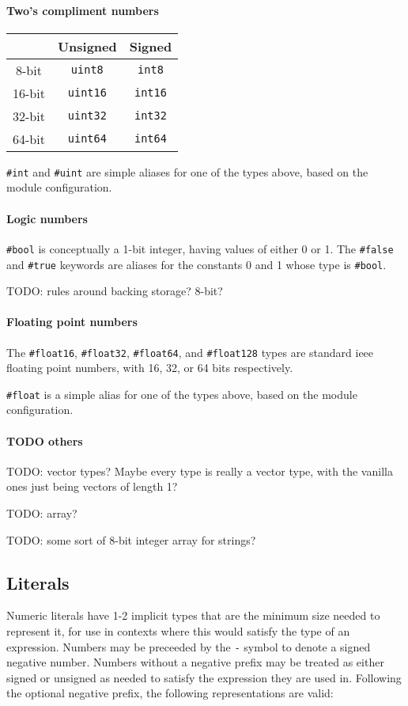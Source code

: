 \documentclass{article}
\newcommand{\code}[1]{\colorbox{light-gray}{\texttt{#1}}}
\newcommand{\breakingparagraph}[1]{\paragraph{#1}\mbox{}\medbreak}
\begin{document}
\breakingparagraph{Two's compliment numbers}

\begin{tabular}{ |c|c|c| }
  \hline
  & Unsigned & Signed\\\hline
  8-bit & \texttt{uint8} & \texttt{int8}\\\hline
  16-bit & \texttt{uint16} & \texttt{int16}\\\hline
  32-bit & \texttt{uint32} & \texttt{int32}\\\hline
  64-bit & \texttt{uint64} & \texttt{int64}\\\hline
\end{tabular}

\code{\#int} and \code{\#uint} are simple aliases for one of the types above, based on the module configuration.


\breakingparagraph{Logic numbers}

\code{\#bool} is conceptually a 1-bit integer, having values of either 0 or 1.  The \code{\#false} and \code{\#true} keywords are aliases for the constants 0 and 1 whose type is \code{\#bool}.

TODO: rules around backing storage?  8-bit?

\breakingparagraph{Floating point numbers}

The \code{\#float16}, \code{\#float32}, \code{\#float64}, and \code{\#float128} types are standard ieee floating point numbers, with 16, 32, or 64 bits respectively.

\code{\#float} is a simple alias for one of the types above, based on the module configuration.

\breakingparagraph{TODO others}

TODO: vector types?  Maybe every type is really a vector type, with the vanilla ones just being vectors of length 1?

TODO: array?

TODO: some sort of 8-bit integer array for strings?

\subsection{Literals}

Numeric literals have 1-2 implicit types that are the minimum size needed to represent it, for use in contexts where this would satisfy the type of an expression.  Numbers may be preceeded by the \code{-} symbol to denote a signed negative number.  Numbers without a negative prefix may be treated as either signed or unsigned as needed to satisfy the expression they are used in.  Following the optional negative prefix, the following representations are valid:
\end{document}
